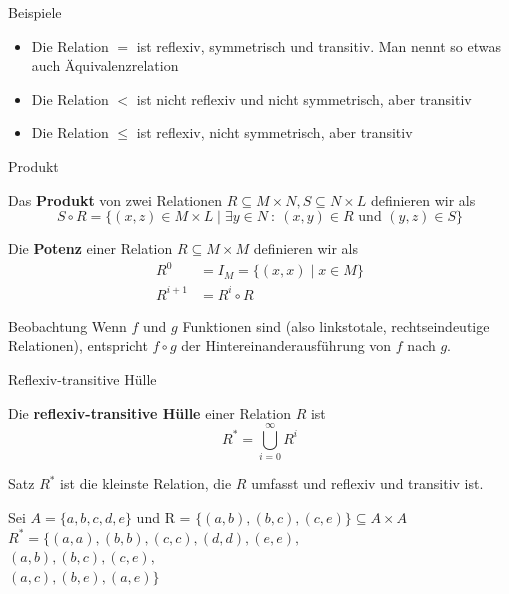 \begin{frame}{Beispiele}
	\begin{itemize}
		\item Die Relation $=$ ist reflexiv, symmetrisch und transitiv. Man nennt so etwas auch Äquivalenzrelation
		\item \pause Die Relation $<$ ist nicht reflexiv und nicht symmetrisch, aber transitiv
		\item \pause Die Relation $\leq$ ist reflexiv, nicht symmetrisch, aber transitiv
	\end{itemize}
\end{frame}

\begin{frame}{Produkt}
	\begin{Definition}
		Das \textbf{Produkt} von zwei Relationen $R \subseteq M \times N, S \subseteq N \times L$ definieren wir als $$S \circ R = \{(x,z) \in M \times L \mid \exists y \in N \ : \ (x,y) \in R \text{ und } (y,z) \in S \}$$
	\end{Definition}	
	\pause
	
	\begin{Definition}
		Die \textbf{Potenz} einer Relation $R \subseteq M \times M$ definieren wir als
		\begin{align*}
			R^0 &= I_M = \{(x,x) \mid x \in M \} \\
			R^{i+1} &= R^i \circ R
		\end{align*}
	\end{Definition}

	\pause
	\begin{block}{Beobachtung}
		Wenn $f$ und $g$ Funktionen sind (also linkstotale, rechtseindeutige Relationen), entspricht $f \circ g$ der Hintereinanderausführung von $f$ nach $g$.
	\end{block}
\end{frame}

\begin{frame}{Reflexiv-transitive Hülle}
	\begin{Definition}
		Die \textbf{reflexiv-transitive Hülle} einer Relation $R$ ist
		$$R^\ast = \bigcup \limits_{i=0}^\infty R^i$$
	\end{Definition}

	\pause
	\begin{block}{Satz}
		$R^*$ ist die kleinste Relation, die $R$ umfasst und reflexiv und
		transitiv ist.
	\end{block}

	\pause
	\begin{Beispiel}
		Sei $A = \{a, b, c, d, e\}$ und R = $\{(a, b), (b, c), (c, e)\} \subseteq A \times A$\\ \pause
		$R^*=\{(a,a), (b,b), (c,c), (d,d), (e,e),$ \\
		$(a,b), (b,c), (c,e),$ \\
		$(a,c), (b,e),(a,e)\}$
	\end{Beispiel}
	
\end{frame}

